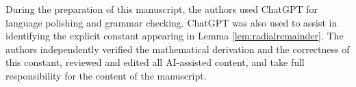 \documentclass{amsart}
\numberwithin{equation}{section}
\theoremstyle{plain}
\theoremstyle{definition}
\theoremstyle{plain}
\theoremstyle{remark}
\numberwithin{figure}{section}
\begin{document}
 During the preparation of this manuscript, the authors used ChatGPT for language polishing and grammar checking. ChatGPT was also used to assist in identifying the explicit constant appearing in Lemma \ref{lem:radialremainder}. The authors independently verified the mathematical derivation and the correctness of this constant, reviewed and edited all AI-assisted content, and take full responsibility for the content of the manuscript.            






 
   



 








% 
% 
\end{document}
